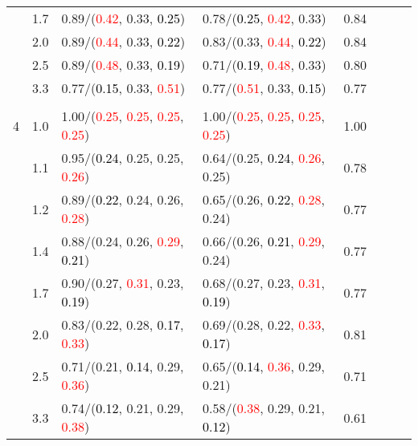 \documentclass[10pt,a4paper]{report}
\begin{document}
\begin{table}[!htbp]
\begin{center}
{\begin{tabular}{ccllcccc}
			&1.7&0.89/(\textcolor{red}{0.42}, 0.33, \textcolor{black}{0.25})&0.78/(\textcolor{black}{0.25}, \textcolor{red}{0.42}, 0.33)&0.84\\
			&2.0&0.89/(\textcolor{red}{0.44}, 0.33, \textcolor{black}{0.22})&0.83/(0.33, \textcolor{red}{0.44}, \textcolor{black}{0.22})&0.84\\
			&2.5&0.89/(\textcolor{red}{0.48}, 0.33, \textcolor{black}{0.19})&0.71/(\textcolor{black}{0.19}, \textcolor{red}{0.48}, 0.33)&0.80\\
			&3.3&0.77/(\textcolor{black}{0.15}, 0.33, \textcolor{red}{0.51})&0.77/(\textcolor{red}{0.51}, 0.33, \textcolor{black}{0.15})&0.77\\
			&&&&\\
			4			&1.0&1.00/(\textcolor{red}{0.25}, \textcolor{red}{0.25}, \textcolor{red}{0.25}, \textcolor{red}{0.25})&1.00/(\textcolor{red}{0.25}, \textcolor{red}{0.25}, \textcolor{red}{0.25}, \textcolor{red}{0.25})&1.00\\
			&1.1&0.95/(\textcolor{black}{0.24}, 0.25, 0.25, \textcolor{red}{0.26})&0.64/(0.25, \textcolor{black}{0.24}, \textcolor{red}{0.26}, 0.25)&0.78\\
			&1.2&0.89/(\textcolor{black}{0.22}, 0.24, 0.26, \textcolor{red}{0.28})&0.65/(0.26, \textcolor{black}{0.22}, \textcolor{red}{0.28}, 0.24)&0.77\\
			&1.4&0.88/(0.24, 0.26, \textcolor{red}{0.29}, \textcolor{black}{0.21})&0.66/(0.26, \textcolor{black}{0.21}, \textcolor{red}{0.29}, 0.24)&0.77\\
			&1.7&0.90/(0.27, \textcolor{red}{0.31}, 0.23, \textcolor{black}{0.19})&0.68/(0.27, 0.23, \textcolor{red}{0.31}, \textcolor{black}{0.19})&0.77\\
			&2.0&0.83/(0.22, 0.28, \textcolor{black}{0.17}, \textcolor{red}{0.33})&0.69/(0.28, 0.22, \textcolor{red}{0.33}, \textcolor{black}{0.17})&0.81\\
			&2.5&0.71/(0.21, \textcolor{black}{0.14}, 0.29, \textcolor{red}{0.36})&0.65/(\textcolor{black}{0.14}, \textcolor{red}{0.36}, 0.29, 0.21)&0.71\\
			&3.3&0.74/(\textcolor{black}{0.12}, 0.21, 0.29, \textcolor{red}{0.38})&0.58/(\textcolor{red}{0.38}, 0.29, 0.21, \textcolor{black}{0.12})&0.61\\
			\bottomrule
		\end{tabular}}
	\end{center}
\end{table}
\end{document}
